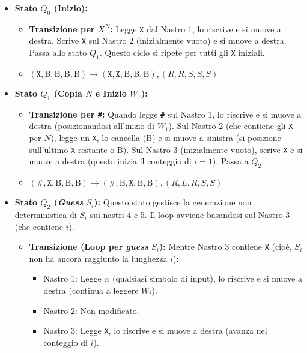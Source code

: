 \documentclass[a4paper, 11pt]{book} %
\theoremstyle{definition}
\newcommand{\B}{\text{B}} %
\begin{document}
\begin{itemize}
    \item \textbf{Stato $Q_0$ (Inizio):}
        \begin{itemize}
            \item \textbf{Transizione per $X^N$:} Legge \texttt{X} dal Nastro 1, lo riscrive e si muove a destra. Scrive \texttt{X} sul Nastro 2 (inizialmente vuoto) e si muove a destra. Passa allo stato $Q_1$. Questo ciclo si ripete per tutti gli \texttt{X} iniziali.
            \item $(\texttt{X}, \B, \B, \B, \B) \to (\texttt{X}, \texttt{X}, \B, \B, \B), (R,R,S,S,S)$
        \end{itemize}
    \item \textbf{Stato $Q_1$ (Copia $N$ e Inizio $W_1$):}
        \begin{itemize}
            \item \textbf{Transizione per \texttt{\#}:} Quando legge \texttt{\#} sul Nastro 1, lo riscrive e si muove a destra (posizionandosi all'inizio di $W_1$). Sul Nastro 2 (che contiene gli \texttt{X} per $N$), legge un \texttt{X}, lo cancella ($\B$) e si muove a sinistra (si posizione sull'ultimo \texttt{X} restante o $\B$). Sul Nastro 3 (inizialmente vuoto), scrive \texttt{X} e si muove a destra (questo inizia il conteggio di $i=1$). Passa a $Q_2$.
            \item $(\texttt{\#}, \texttt{X}, \B, \B, \B) \to (\texttt{\#}, \B, \texttt{X}, \B, \B), (R,L,R,S,S)$
        \end{itemize}
    \item \textbf{Stato $Q_2$ (\textit{Guess} $S_i$):}
        Questo stato gestisce la generazione non deterministica di $S_i$ sui nastri 4 e 5. Il loop avviene basandosi sul Nastro 3 (che contiene $i$).
        \begin{itemize}
            \item \textbf{Transizione (Loop per \textit{guess} $S_i$):}
                Mentre Nastro 3 contiene \texttt{X} (cioè, $S_i$ non ha ancora raggiunto la lunghezza $i$):
                \begin{itemize}
                    \item Nastro 1: Legge $\alpha$ (qualsiasi simbolo di input), lo riscrive e si muove a destra (continua a leggere $W_i$).
                    \item Nastro 2: Non modificato.
                    \item Nastro 3: Legge \texttt{X}, lo riscrive e si muove a destra (avanza nel conteggio di $i$).

\end{itemize}
\end{itemize}
\end{itemize}
\end{document}
